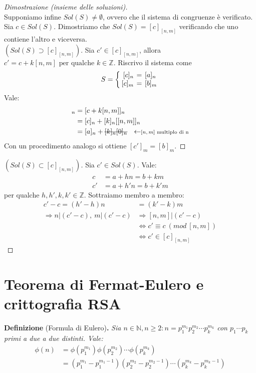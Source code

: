 \documentclass[12pt,twoscolu]{article}
\newcommand{\N}{\mathbb{N}}
\newcommand{\Z}{\mathbb{Z}}
\newcommand{\sesolose}{\Leftrightarrow}
\newcommand{\implica}{\Longrightarrow}
\newcommand{\pq}{\text{ per qualche }}
\renewcommand\qedsymbol{$\blacksquare$}
\newcommand{\stkout}[1]{\ifmmode\text{\sout{\ensuremath{#1}}}\else\sout{#1}\fi}
\begin{document}
\begin{proof}[Dimostrazione (insieme delle soluzioni)]\ \\
Supponiamo infine $Sol(S) \ne \emptyset$, ovvero che il sistema di congruenze è verificato. Sia $c \in Sol(S)$. Dimostriamo che $Sol(S) = [c]_{[n,m]}$ verificando che uno contiene l'altro e viceversa.
\\[1\baselineskip]$(Sol(S) \supset [c]_{[n,m]})$.
Sia $ c' \in [c]_{[n,m]}$, allora $c' = c + k[n,m] \pq k \in \Z$. Riscrivo il sistema come
\[
S = \left\{
\setlength\arraycolsep{2pt}
\begin{array}{rcl} [c]_n & = & [a]_n \\ \relax
 [c]_m & = & [b]_m
\end{array}\right
.
\]
Vale:
\begin{align*}
[c']_n &= [c + k[n,m]]_n \\ 
&= [c]_n + [k]_n [[n,m]]_n \\
&= [a]_n + \stkout{[k]_n [0]_n} \ \ \leftarrow\scriptstyle{ \text{$[n,m]$ multiplo di n}}
\end{align*}
Con un procedimento analogo si ottiene $[c']_m = [b]_m$.
\end{proof}
\renewcommand\qedsymbol{$\blacksquare$}
\begin{proof}[$(Sol(S) \subset {[c]}_{[n,m]})$]
Sia $c' \in Sol(S)$. Vale:
\begin{align*}
c &= a+hn = b + km \\
c' &= a+h'n = b + k'm
\end{align*}
per qualche $h, h', k, k' \in \Z$. Sottraiamo membro a membro:
\begin{align*}
c' - c = (h' - h)n &= (k' - k)m \\
\implica n | (c' -c),\ m|(c' - c) &\implica [n, m]|(c' - c) \\
&\sesolose c' \equiv c \ (mod \ [n, m]) \\
&\sesolose c' \in [c]_{[n,m]}
\end{align*}
\end{proof}

\section{Teorema di Fermat-Eulero e crittografia RSA}
\textbf{Definizione} (Formula di Eulero)\textbf{.} \textit{Sia $n \in \N, n \ge 2: n = p^{m_1}_1 p^{m_2}_2 \cdots p^{m_k}_k$ con $p_1 \cdots p_k$ primi a due a due distinti. Vale:
\begin{align*}
\phi(n) &= \phi(p^{m_1}_1)\phi(p^{m_2}_2) \cdots \phi(p^{m_k}_k) \\
&= (p^{m_1}_1 - p^{m_1 - 1}_1) (p^{m_2}_2 - p^{m_2 - 1}_2) \cdots (p^{m_k}_k - p^{m_k - 1}_k)
\end{align*}
}
\end{document}
